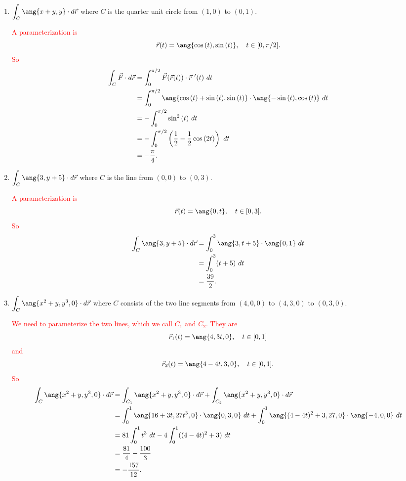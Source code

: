 \documentclass[12pt,reqno]{amsart}
\begin{document}
\bigskip
\begin{enumerate}
\item $\displaystyle\int_C \ang{x+y,y} \cdot d \vec{r}$ where $C$ is the quarter unit circle from $(1,0)$ to $(0,1)$.

\bigskip
\textcolor{red}{A parameterization is
	\[\vec{r}(t) = \ang{\cos{(t)},\sin{(t)}}, \quad t\in [0,\pi/2].
	\]
So
\begin{align*}
\int_C \vec{F} \cdot d\vec{r} &= \int_0^{\pi/2} \vec{F}(\vec{r}(t)) \cdot \vec{r}\ '(t) \ d t \\
&= \int_{0}^{\pi/2} \ang{\cos{(t)}+\sin{(t)},\sin{(t)}} \cdot \ang{-\sin{(t)},\cos{(t)}} \ dt \\
&= - \int_0^{\pi/2} \sin^2{(t)} \ dt \\
&= - \int_0^{\pi/2} \left( \frac{1}{2} - \frac{1}{2} \cos{(2t)} \right) \ dt \\
&= - \frac{\pi}{4}.
\end{align*}}
\bigskip

\item $\displaystyle\int_C \ang{3, y+5} \cdot d\vec{r}$ where $C$ is the line from $(0,0)$ to $(0,3)$.

\bigskip
\textcolor{red}{A parameterization is
	\[\vec{r}(t) = \ang{0,t}, \quad t\in [0,3].
	\]
So
\begin{align*}
\int_C \ang{3, y+5} \cdot d\vec{r} &= \int_0^3 \ang{3,t+5} \cdot \ang{0,1} \ dt \\
&= \int_0^3 (t+5) \ dt \\
&= \frac{39}{2}.
\end{align*}}
\bigskip

\item $\displaystyle\int_C \ang{x^2+y, y^3 ,0} \cdot d\vec{r}$ where $C$ consists of the two line segments from $(4,0,0)$ to $(4,3,0)$ to $(0,3,0)$.

\bigskip
\textcolor{red}{We need to parameterize the two lines, which we call $C_1$ and $C_2$. They are
	\[\vec{r}_1(t) = \ang{4,3t,0}, \quad t\in [0,1]
	\]
and
	\[\vec{r}_2(t) = \ang{4-4t,3,0}, \quad t\in [0,1].
	\]
So
\begin{align*}
\int_C \ang{x^2+y, y^3 ,0} \cdot d\vec{r} &= \int_{C_1} \ang{x^2+y, y^3 ,0} \cdot d\vec{r} + \int_{C_2}\ang{x^2+y, y^3 ,0} \cdot d\vec{r} \\
&= \int_0^1 \ang{16+3t, 27t^3 ,0} \cdot \ang{0,3,0} \ dt + \int_ 0^1\ang{(4-4t)^2+3, 27 ,0} \cdot \ang{-4,0,0} \ dt \\
&= 81 \int_0^1 t^3 \ dt -4 \int_0^1 ( (4-4t)^2 + 3) \ dt \\
&=\frac{81}{4} - \frac{100}{3} \\
&= - \frac{157}{12}.
\end{align*}}
\bigskip


\end{enumerate}
\end{document}
